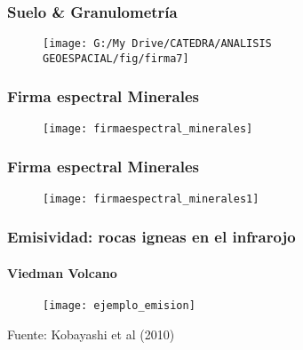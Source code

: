 \documentclass[]{beamer}
\begin{document}
\begin{frame}
\frametitle{Suelo \& Granulometría}
  \begin{figure}
    \centering
    \texttt{[image: G:/My Drive/CATEDRA/ANALISIS GEOESPACIAL/fig/firma7]}
  \end{figure}
\end{frame}
\begin{frame}
\frametitle{Firma espectral Minerales}
  \begin{figure}
    \centering
    \texttt{[image: firmaespectral\_minerales]}
  \end{figure}
\end{frame}
\begin{frame}
\frametitle{Firma espectral Minerales}
  \begin{figure}
    \centering
    \texttt{[image: firmaespectral\_minerales1]}
  \end{figure}
\end{frame}
\begin{frame}
\frametitle{Emisividad: rocas igneas en el infrarojo}
\framesubtitle{Viedman Volcano}
  \begin{figure}
    \centering
    \texttt{[image: ejemplo\_emision]}
  \end{figure}
  \tiny{Fuente: Kobayashi et al (2010)}
\end{frame}
\end{document}

